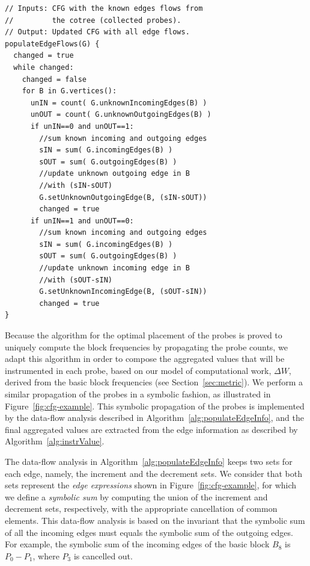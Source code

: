 \documentclass[sigplan,10pt]{acmart}
\theoremstyle{definition}
\begin{document}
\begin{lstlisting}[caption={Post-processing of the CFG for populating all edge flows based on the collected probes.}, label={lst:populateEdgeFlows}, float]
// Inputs: CFG with the known edges flows from
//         the cotree (collected probes).
// Output: Updated CFG with all edge flows.
populateEdgeFlows(G) {
  changed = true
  while changed:
    changed = false
    for B in G.vertices():
      unIN = count( G.unknownIncomingEdges(B) )
      unOUT = count( G.unknownOutgoingEdges(B) )
      if unIN==0 and unOUT==1:
        //sum known incoming and outgoing edges
        sIN = sum( G.incomingEdges(B) )
        sOUT = sum( G.outgoingEdges(B) )
        //update unknown outgoing edge in B
        //with (sIN-sOUT)
        G.setUnknownOutgoingEdge(B, (sIN-sOUT))
        changed = true
      if unIN==1 and unOUT==0:
        //sum known incoming and outgoing edges
        sIN = sum( G.incomingEdges(B) )
        sOUT = sum( G.outgoingEdges(B) )
        //update unknown incoming edge in B
        //with (sOUT-sIN)
        G.setUnknownIncomingEdge(B, (sOUT-sIN))
        changed = true
}
\end{lstlisting}


Because the algorithm for the optimal placement of the probes is proved to uniquely compute the block frequencies by propagating the probe counts, we adapt this algorithm in order to compose the aggregated values that will be instrumented in each probe, based on our model of computational work, $\Delta W$, derived from the basic block frequencies (see Section~\ref{sec:metric}).
We perform a similar propagation of the probes in a symbolic fashion, as illustrated in Figure~\ref{fig:cfg-example}.
This symbolic propagation of the probes is implemented by the data-flow analysis described in Algorithm~\ref{alg:populateEdgeInfo}, and the final aggregated values are extracted from the edge information as described by Algorithm~\ref{alg:instrValue}.

The data-flow analysis in Algorithm~\ref{alg:populateEdgeInfo} keeps two sets for each edge, namely, the increment and the decrement sets.
We consider that both sets represent the \textit{edge expressions} shown in Figure~\ref{fig:cfg-example}, for which we define a \textit{symbolic sum} by computing the union of the increment and decrement sets, respectively, with the appropriate cancellation of common elements.
This data-flow analysis is based on the invariant that the symbolic sum of all the incoming edges must equals the symbolic sum of the outgoing edges.
For example, the symbolic sum of the incoming edges of the basic block $B_8$ is $P_0 - P_1$, where $P_3$ is cancelled out.
\end{document}
